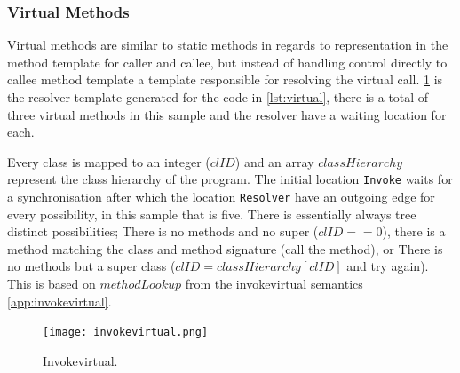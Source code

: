 \subsubsection{Virtual Methods}
Virtual methods are similar to static methods in regards to representation in the method template for caller and callee, but instead of handling control directly to callee method template a template responsible for resolving the virtual call.
\cref{fig:invokevirtual} is the resolver template generated for the code in \cref{lst:virtual}, there is a total of three virtual methods in this sample and the resolver have a waiting location for each. 


Every class is mapped to an integer ($clID$) and an array $classHierarchy$ represent the class hierarchy of the program. The initial location \texttt{Invoke} waits for a synchronisation after which the location \texttt{Resolver} have an outgoing edge for every possibility, in this sample that is five. There is essentially always tree distinct possibilities; There is no methods and no super ($clID == 0$), there is a method matching the class and method signature (call the method), or There is no methods but a super class ($clID = classHierarchy[clID]$ and try again).
This is based on $methodLookup$ from the invokevirtual semantics \cref{app:invokevirtual}. 

 
\begin{figure}
\centering
\texttt{[image: invokevirtual.png]}
\caption{Invokevirtual.}
\label{fig:invokevirtual}
\end{figure}


